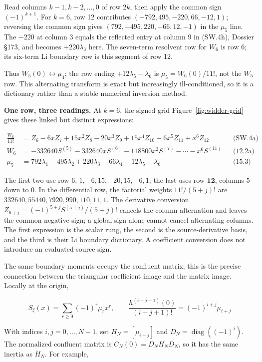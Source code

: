 \documentclass[
  11pt,
]{book}
\newcommand{\figref}[1]{Figure~\ref{#1}}
\begin{document}
Read columns \(k-1,k-2,\ldots,0\) of row \(2k\), then apply the common
sign \((-1)^{k+1}\). For \(k=6\), row 12 contributes
\((-792,495,-220,66,-12,1)\); reversing the common sign gives
\((792,-495,220,-66,12,-1)\) in the \(\mu_5\) line. The \(-220\) at
column 3 equals the reflected entry at column 9 in (SW.4h), Dossier
§173, and becomes \(+220\lambda_3\) here. The seven-term resolvent row
for \(W_6\) is row 6; its six-term Li boundary row is this segment of
row 12.

Thus \(W_5(0)\leftrightarrow\mu_4\); the row ending
\(+12\lambda_5-\lambda_6\) is \(\mu_5=W_6(0)/11!\), not the \(W_5\) row.
This alternating transform is exact but increasingly ill-conditioned, so
it is a dictionary rather than a stable numerical inversion method.

\textbf{One row, three readings.} At \(k=6\), the signed grid
\figref{fig:widder-grid} gives these linked but distinct expressions:

\[
\begin{aligned}
\frac{W_6}{11!}&=Z_6-6xZ_7+15x^2Z_8-20x^3Z_9+15x^4Z_{10}-6x^5Z_{11}+x^6Z_{12}
&&\text{(SW.4a)}\\[3pt]
W_6&=-332640S^{(5)}-332640xS^{(6)}-118800x^2S^{(7)}-\cdots-x^6S^{(11)}
&&\text{(12.2a)}\\[3pt]
\mu_5&=792\lambda_1-495\lambda_2+220\lambda_3-66\lambda_4+12\lambda_5-\lambda_6
&&\text{(15.3)}
\end{aligned}
\]

The first two use row \(6\), \(1,-6,15,-20,15,-6,1\); the last uses row
\(\mathbf{12}\), columns \(5\) down to \(0\). In the differential row,
the factorial weights \(11!/(5+j)!\) are
\(332640,55440,7920,990,110,11,1\). The derivative conversion
\(Z_{6+j}=(-1)^{5+j}S^{(5+j)}/(5+j)!\) cancels the column alternation
and leaves the common negative sign; a global sign alone cannot cancel
alternating columns. The first expression is the scalar rung, the second
is the source-derivative basis, and the third is their Li boundary
dictionary. A coefficient conversion does not introduce an
evaluated-source sign.

The same boundary moments occupy the confluent matrix; this is the
precise connection between the triangular coefficient image and the
matrix image. Locally at the origin,

\[
S_\xi(x)=\sum_{r\ge0}(-1)^r\mu_rx^r,\qquad
\frac{h^{(i+j+1)}(0)}{(i+j+1)!}=(-1)^{i+j}\mu_{i+j}
\tag{15.4}
\]

With indices \(i,j=0,\ldots,N-1\), set \(H_N=[\mu_{i+j}]\) and
\(D_N=\operatorname{diag}((-1)^i)\). The normalized confluent matrix is
\(C_N(0)=D_NH_ND_N\), so it has the same inertia as \(H_N\). For
example,
\end{document}
